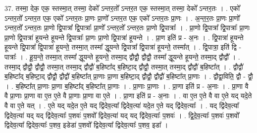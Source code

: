 \documentclass[17pt]{extarticle}
\begin{document}
37. तस्मा॒ देक॒ एक॒ स्तस्मा॒त् तस्मा॒ देको᳚ ऽन्तर॒तो᳚ ऽन्तर॒त एक॒ स्तस्मा॒त् तस्मा॒ देको᳚ ऽन्तर॒तः । . एको᳚ ऽन्तर॒तो᳚ ऽन्तर॒त एक॒ एको᳚ ऽन्तर॒तः प्रा॒णः प्रा॒णो᳚ ऽन्तर॒त एक॒ एको᳚ ऽन्तर॒तः प्रा॒णः । . अ॒न्त॒र॒तः प्रा॒णः प्रा॒णो᳚ ऽन्तर॒तो᳚ ऽन्तर॒तः प्रा॒णो द्वि॒पात्रा᳚ द्वि॒पात्राः᳚ प्रा॒णो᳚ ऽन्तर॒तो᳚ ऽन्तर॒तः प्रा॒णो द्वि॒पात्राः᳚ । . प्रा॒णो द्वि॒पात्रा᳚ द्वि॒पात्राः᳚ प्रा॒णः प्रा॒णो द्वि॒पात्रा॑ हूयन्ते हूयन्ते द्वि॒पात्राः᳚ प्रा॒णः प्रा॒णो द्वि॒पात्रा॑ हूयन्ते । . प्रा॒ण इति॑ प्र - अ॒नः । . द्वि॒पात्रा॑ हूयन्ते हूयन्ते द्वि॒पात्रा᳚ द्वि॒पात्रा॑ हूयन्ते॒ तस्मा॒त् तस्मा᳚ द्धूयन्ते द्वि॒पात्रा᳚ द्वि॒पात्रा॑ हूयन्ते॒ तस्मा᳚त् । . द्वि॒पात्रा॒ इति॑ द्वि - पात्राः᳚ । . हू॒य॒न्ते॒ तस्मा॒त् तस्मा᳚ द्धूयन्ते हूयन्ते॒ तस्मा॒द् द्वौद्वौ॒ द्वौद्वौ॒ तस्मा᳚ द्धूयन्ते हूयन्ते॒ तस्मा॒द् द्वौद्वौ᳚ । . तस्मा॒द् द्वौद्वौ॒ द्वौद्वौ॒ तस्मा॒त् तस्मा॒द् द्वौद्वौ॑ ब॒हिष्टा᳚द् ब॒हिष्टा॒द् द्वौद्वौ॒ तस्मा॒त् तस्मा॒द् द्वौद्वौ॑ ब॒हिष्टा᳚त् । . द्वौद्वौ॑ ब॒हिष्टा᳚द् ब॒हिष्टा॒द् द्वौद्वौ॒ द्वौद्वौ॑ ब॒हिष्टा᳚त् प्रा॒णाः प्रा॒णा ब॒हिष्टा॒द् द्वौद्वौ॒ द्वौद्वौ॑ ब॒हिष्टा᳚त् प्रा॒णाः । . द्वौद्वा॒विति॒ द्वौ - द्वौ॒ । . ब॒हिष्टा᳚त् प्रा॒णाः प्रा॒णा ब॒हिष्टा᳚द् ब॒हिष्टा᳚त् प्रा॒णाः । . प्रा॒णाः प्रा॒णाः । . प्रा॒णा इति॑ प्र - अ॒नाः । . प्रा॒णा वै वै प्रा॒णाः प्रा॒णा वा ए॒त ए॒ते वै प्रा॒णाः प्रा॒णा वा ए॒ते । . प्रा॒णा इति॑ प्र - अ॒नाः । . वा ए॒त ए॒ते वै वा ए॒ते यद् यदे॒ते वै वा ए॒ते यत् । . ए॒ते यद् यदे॒त ए॒ते यद् द्वि॑देव॒त्या᳚ द्विदेव॒त्या॑ यदे॒त ए॒ते यद् द्वि॑देव॒त्याः᳚ । . यद् द्वि॑देव॒त्या᳚ द्विदेव॒त्या॑ यद् यद् द्वि॑देव॒त्याः᳚ प॒शवः॑ प॒शवो᳚ द्विदेव॒त्या॑ यद् यद् द्वि॑देव॒त्याः᳚ प॒शवः॑ । . द्वि॒दे॒व॒त्याः᳚ प॒शवः॑ प॒शवो᳚ द्विदेव॒त्या᳚ द्विदेव॒त्याः᳚ प॒शव॒ इडेडा॑ प॒शवो᳚ द्विदेव॒त्या᳚ द्विदेव॒त्याः᳚ प॒शव॒ इडा᳚ । \newline
\end{document}
